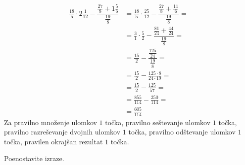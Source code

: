 \documentclass[addpoints]{exam}
\begin{document}
\begin{questions}
\begin{parts}
        \begin{solution}[3cm]
            \begin{align*} 
                \frac{18}{5}\cdot 2\frac{1}{12}-\dfrac{\frac{27}{8}+1\frac{5}{6}}{\frac{19}{8}}&=\frac{18}{5}\cdot \frac{25}{12}-\dfrac{\frac{27}{8}+\frac{11}{6}}{\frac{19}{8}}= \\
                                                                                            &= \frac{3}{1}\cdot \frac{5}{2}-\dfrac{\frac{81}{24}+\frac{44}{24}}{\frac{19}{8}}= \\
                                                                                            &=\frac{15}{2}-\dfrac{\frac{125}{24}}{\frac{19}{8}}= \\
                                                                                            &=\frac{15}{2}-\frac{125\cdot 8}{24\cdot 19}= \\
                                                                                            &=\frac{15}{2}-\frac{125}{57}= \\
                                                                                            &=\frac{855}{114}-\frac{250}{114}= \\
                                                                                            &=\frac{605}{114}
            \end{align*}
            Za pravilno množenje ulomkov $1$ točka, pravilno seštevanje ulomkov $1$ točka, pravilno razreševanje dvojnih ulomkov $1$ točka, pravilno odštevanje ulomkov $1$ točka, pravilen okrajšan rezultat $1$ točka.
        \end{solution}


    \end{parts}






    \newpage


        \question
        Poenostavite izraze.
\end{questions}
\end{document}
